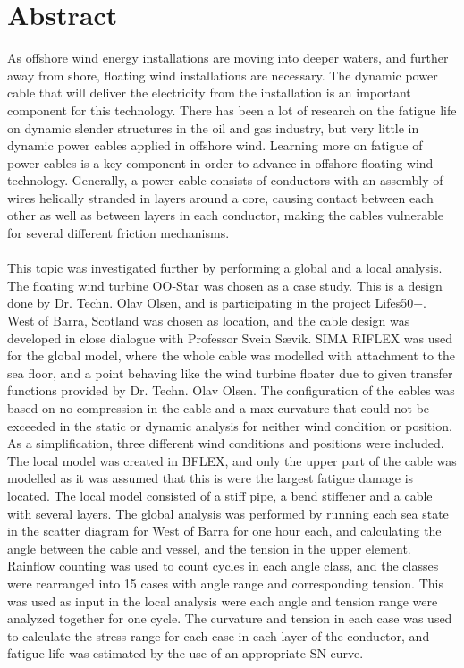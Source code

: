 \chapter*{Abstract}

As offshore wind energy installations are moving into deeper waters, and further away from shore, floating wind installations are necessary. The dynamic power cable that will deliver the electricity from the installation is an important component for this technology. There has been a lot of research on the fatigue life on dynamic slender structures in the oil and gas industry, but very little in dynamic power cables applied in offshore wind. Learning more on fatigue of power cables is a key component in order to advance in offshore floating wind technology. Generally, a power cable consists of conductors with an assembly of wires helically stranded in layers around a core, causing contact between each other as well as between layers in each conductor, making the cables vulnerable for several different friction mechanisms.\\\\ This topic was investigated further by performing a global and a local analysis. The floating wind turbine OO-Star was chosen as a case study. This is a design done by Dr. Techn. Olav Olsen, and is participating in the project Lifes50+. West of Barra, Scotland was chosen as location, and the cable design was developed in close dialogue with Professor Svein Sævik. SIMA RIFLEX was used for the global model, where the whole cable was modelled with attachment to the sea floor, and a point behaving like the wind turbine floater due to given transfer functions provided by Dr. Techn. Olav Olsen. The configuration of the cables was based on no compression in the cable and a max curvature that could not be exceeded in the static or dynamic analysis for neither wind condition or position. As a simplification, three different wind conditions and positions were included.  The local model was created in BFLEX, and only the upper part of the cable was modelled as it was assumed that this is were the largest fatigue damage is located. The local model consisted of a stiff pipe, a bend stiffener and a cable with several layers. \newline 
\newline
The global analysis was performed by running each sea state in the scatter diagram for West of Barra for one hour each, and calculating the angle between the cable and vessel, and the tension in the upper element. Rainflow counting was used to count cycles in each angle class, and the classes were rearranged into 15 cases with angle range and corresponding tension. This was used as input in the local analysis were each angle and tension range were analyzed together for one cycle. The curvature and tension in each case was used to calculate the stress range for each case in each layer of the conductor, and fatigue life was estimated by the use of an appropriate SN-curve.  \\\\
